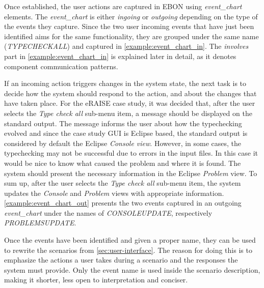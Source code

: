 \documentclass[conference]{IEEEtran}
\begin{document}
Once established, the user actions are captured in EBON using
\emph{event\_chart} elements. The \emph{event\_chart} is either
\emph{ingoing} or \emph{outgoing} depending on the type of the events
they capture.  Since the two user incoming events that have just been
identified aims for the same functionality, they are grouped under the
same name (\emph{TYPECHECKALL}) and captured in
\autoref{example:event_chart_in}.  The \emph{involves} part in
\autoref{example:event_chart_in} is explained later in detail, as it
denotes component communication patterns.



If an incoming action triggers changes in the system state, the next
task is to decide how the system should respond to the action, and
about the changes that have taken place.  For the eRAISE case study,
it was decided that, after the user selects the \emph{Type check all}
sub-menu item, a message should be displayed on the standard output.
The message informs the user about how the typechecking evolved and
since the case study GUI is Eclipse based, the standard output is
considered by default the Eclipse \emph{Console view}.  However, in
some cases, the typechecking may not be successful due to errors in
the input files.  In this case it would be nice to know what caused
the problem and where it is found.  The system should present the
necessary information in the Eclipse \emph{Problem} view.  To sum up,
after the user selects the \emph{Type check all} sub-menu item, the
system updates the \emph{Console} and \emph{Problem} views with
appropriate information. \autoref{example:event_chart_out} presents
the two events captured in an outgoing \emph{event\_chart} under the
names of \emph{CONSOLEUPDATE}, respectively \emph{PROBLEMSUPDATE}.




Once the events have been identified and given a proper name, they
can be used to rewrite the scenarios from
\autoref{sec:user-interface}. The reason for doing this is to
emphasize the actions a user takes
during a scenario and the responses the system must provide. Only the
event name is used inside the scenario description, making it
shorter, less open to interpretation and conciser.
\end{document}
